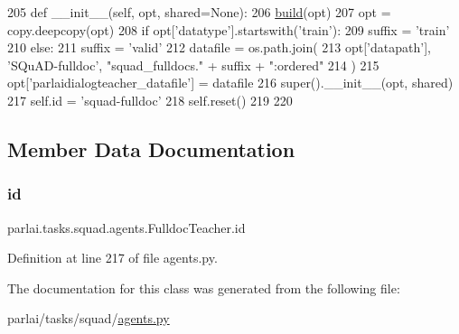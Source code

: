 \begin{DoxyCode}
205     \textcolor{keyword}{def }\_\_init\_\_(self, opt, shared=None):
206         \hyperlink{namespaceparlai_1_1mturk_1_1tasks_1_1talkthewalk_1_1download_a8c0fbb9b6dfe127cb8c1bd6e7c4e33fd}{build}(opt)
207         opt = copy.deepcopy(opt)
208         \textcolor{keywordflow}{if} opt[\textcolor{stringliteral}{'datatype'}].startswith(\textcolor{stringliteral}{'train'}):
209             suffix = \textcolor{stringliteral}{'train'}
210         \textcolor{keywordflow}{else}:
211             suffix = \textcolor{stringliteral}{'valid'}
212         datafile = os.path.join(
213             opt[\textcolor{stringliteral}{'datapath'}], \textcolor{stringliteral}{'SQuAD-fulldoc'}, \textcolor{stringliteral}{"squad\_fulldocs."} + suffix + \textcolor{stringliteral}{":ordered"}
214         )
215         opt[\textcolor{stringliteral}{'parlaidialogteacher\_datafile'}] = datafile
216         super().\_\_init\_\_(opt, shared)
217         self.id = \textcolor{stringliteral}{'squad-fulldoc'}
218         self.reset()
219 
220 
\end{DoxyCode}


\subsection{Member Data Documentation}
\mbox{\label{classparlai_1_1tasks_1_1squad_1_1agents_1_1FulldocTeacher_a3fca2b49bb7fffc80462c30b700a6168}} 
\subsubsection{\texorpdfstring{id}{id}}
{\footnotesize\ttfamily parlai.\+tasks.\+squad.\+agents.\+Fulldoc\+Teacher.\+id}



Definition at line 217 of file agents.\+py.



The documentation for this class was generated from the following file\+:\begin{DoxyCompactItemize}
\item 
parlai/tasks/squad/\hyperlink{parlai_2tasks_2squad_2agents_8py}{agents.\+py}\end{DoxyCompactItemize}
